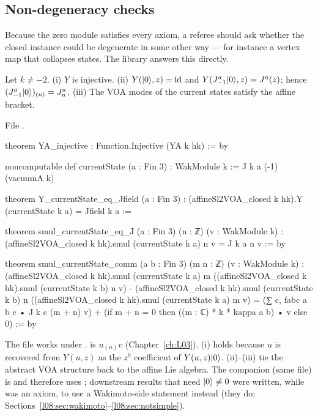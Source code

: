 \subsection{Non-degeneracy checks}

Because the zero module satisfies every axiom, a referee should ask whether the closed instance could
be degenerate in some other way --- for instance a vertex map that collapses states. The library
answers this directly.

\begin{theorem}\label{l08:thm:nondeg}
Let $k\ne-2$. (i) $Y$ is injective. (ii) $Y(|0\rangle,z)=\mathrm{id}$ and
$Y(J^a_{-1}|0\rangle,z) = J^a(z)$; hence $(J^a_{-1}|0\rangle)_{(n)} = J^a_n$. (iii) The VOA modes of
the current states satisfy the affine bracket.
\end{theorem}

\noindent File .
\begin{leancode}
theorem YA_injective : Function.Injective (YA k hk) := by

noncomputable def currentState (a : Fin 3) : WakModule k := J k a (-1) (vacuumA k)

theorem Y_currentState_eq_Jfield (a : Fin 3) :
    (affineSl2VOA_closed k hk).Y (currentState k a) = Jfield k a :=

theorem smul_currentState_eq_J (a : Fin 3) (n : ℤ) (v : WakModule k) :
    (affineSl2VOA_closed k hk).smul (currentState k a) n v = J k a n v := by

theorem smul_currentState_comm (a b : Fin 3) (m n : ℤ) (v : WakModule k) :
    (affineSl2VOA_closed k hk).smul (currentState k a) m
        ((affineSl2VOA_closed k hk).smul (currentState k b) n v)
      - (affineSl2VOA_closed k hk).smul (currentState k b) n
        ((affineSl2VOA_closed k hk).smul (currentState k a) m v)
      = (∑ c, fabc a b c • J k c (m + n) v)
        + (if m + n = 0 then ((m : ℂ) * k * kappa a b) • v else 0) := by
\end{leancode}

\begin{dictionary}
The file works under .  is $u_{(n)}v$
(Chapter~\ref{ch:L03}). (i) holds because $u$ is recovered from $Y(u,z)$ as the $z^0$ coefficient of
$Y(u,z)|0\rangle$. (ii)--(iii) tie the abstract VOA structure back to the affine Lie algebra. The
companion  (same file) is  and therefore uses
; downstream results that need $|0\rangle\ne0$ were written, while  was an
axiom, to use a Wakimoto-side statement instead (they do; Sections~\ref{l08:sec:wakimoto}--\ref{l08:sec:notsimple}).
\end{dictionary}

